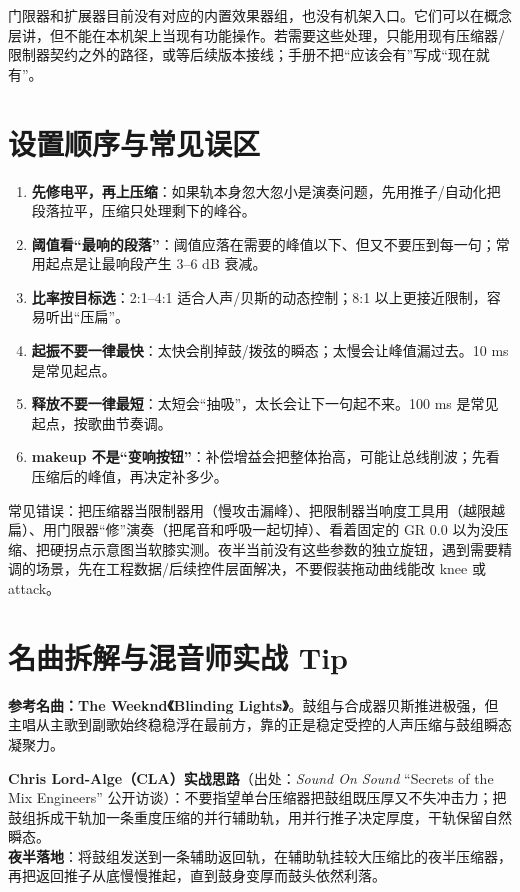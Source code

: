 门限器和扩展器目前没有对应的内置效果器组，也没有机架入口。它们可以在概念层讲，但不能在本机架上当现有功能操作。若需要这些处理，只能用现有压缩器/限制器契约之外的路径，或等后续版本接线；手册不把“应该会有”写成“现在就有”。

\section{设置顺序与常见误区}

\begin{enumerate}
  \item \textbf{先修电平，再上压缩}：如果轨本身忽大忽小是演奏问题，先用推子/自动化把段落拉平，压缩只处理剩下的峰谷。
  \item \textbf{阈值看“最响的段落”}：阈值应落在需要的峰值以下、但又不要压到每一句；常用起点是让最响段产生 3–6 dB 衰减。
  \item \textbf{比率按目标选}：2:1–4:1 适合人声/贝斯的动态控制；8:1 以上更接近限制，容易听出“压扁”。
  \item \textbf{起振不要一律最快}：太快会削掉鼓/拨弦的瞬态；太慢会让峰值漏过去。10 ms 是常见起点。
  \item \textbf{释放不要一律最短}：太短会“抽吸”，太长会让下一句起不来。100 ms 是常见起点，按歌曲节奏调。
  \item \textbf{makeup 不是“变响按钮”}：补偿增益会把整体抬高，可能让总线削波；先看压缩后的峰值，再决定补多少。
\end{enumerate}

常见错误：把压缩器当限制器用（慢攻击漏峰）、把限制器当响度工具用（越限越扁）、用门限器“修”演奏（把尾音和呼吸一起切掉）、看着固定的 GR 0.0 以为没压缩、把硬拐点示意图当软膝实测。夜半当前没有这些参数的独立旋钮，遇到需要精调的场景，先在工程数据/后续控件层面解决，不要假装拖动曲线能改 knee 或 attack。

\section{名曲拆解与混音师实战 Tip}

\textbf{参考名曲：The Weeknd《Blinding Lights》}。鼓组与合成器贝斯推进极强，但主唱从主歌到副歌始终稳稳浮在最前方，靠的正是稳定受控的人声压缩与鼓组瞬态凝聚力。

\begin{tipbox}
\textbf{Chris Lord-Alge（CLA）实战思路}（出处：\emph{Sound On Sound} ``Secrets of the Mix Engineers'' 公开访谈）：不要指望单台压缩器把鼓组既压厚又不失冲击力；把鼓组拆成干轨加一条重度压缩的并行辅助轨，用并行推子决定厚度，干轨保留自然瞬态。\\
\textbf{夜半落地}：将鼓组发送到一条辅助返回轨，在辅助轨挂较大压缩比的夜半压缩器，再把返回推子从底慢慢推起，直到鼓身变厚而鼓头依然利落。
\end{tipbox}


